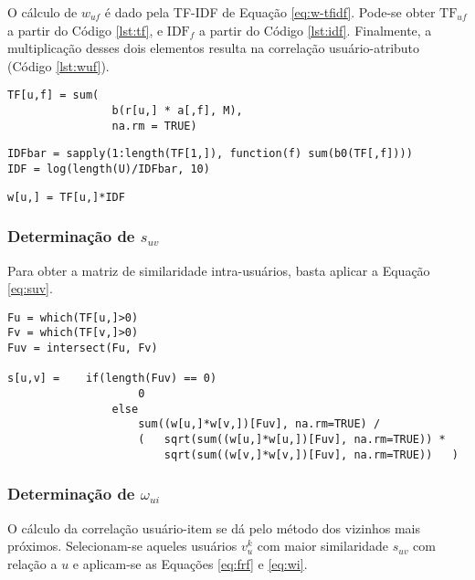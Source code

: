 O cálculo de $w_{uf}$ é dado pela TF-IDF de Equação \ref{eq:w-tfidf}. Pode-se obter $\mathrm{TF}_{uf}$ a partir do Código \ref{lst:tf}, e $\mathrm{IDF}_{f}$ a partir do Código \ref{lst:idf}. Finalmente, a multiplicação desses dois elementos resulta na correlação usuário-atributo (Código \ref{lst:wuf}).


\begin{lstlisting}[caption=Determinação de $\mathrm{TF}_{uf}$,label=lst:tf]
TF[u,f] = sum(
        		b(r[u,] * a[,f], M),
        		na.rm = TRUE)
\end{lstlisting}


\begin{lstlisting}[caption=Determinação de $\mathrm{IDF}_{f}$,label=lst:idf]
IDFbar = sapply(1:length(TF[1,]), function(f) sum(b0(TF[,f])))
IDF = log(length(U)/IDFbar, 10)
\end{lstlisting}

\begin{lstlisting}[caption=Determinação de $w_{uf}$,label=lst:wuf]
w[u,] = TF[u,]*IDF
\end{lstlisting}

\subsubsection{Determinação de $s_{uv}$} %
\label{ssub:determina_o_de_}

Para obter a matriz de similaridade intra-usuários, basta aplicar a Equação \ref{eq:suv}.

\begin{lstlisting}[caption=Determinação de $s_{uv}$]
Fu = which(TF[u,]>0)
Fv = which(TF[v,]>0)
Fuv = intersect(Fu, Fv)

s[u,v] = 	if(length(Fuv) == 0) 
					0 
				else 
					sum((w[u,]*w[v,])[Fuv], na.rm=TRUE) / 
					(	sqrt(sum((w[u,]*w[u,])[Fuv], na.rm=TRUE)) * 
						sqrt(sum((w[v,]*w[v,])[Fuv], na.rm=TRUE))	)

\end{lstlisting}

\subsubsection{Determinação de $\omega_{ui}$} %
\label{ssub:determina_o_de_}

O cálculo da correlação usuário-item se dá pelo método dos vizinhos mais próximos. Selecionam-se aqueles usuários $v_u^k$ com maior similaridade $s_{uv}$ com relação a $u$ e aplicam-se as Equações \ref{eq:frf} e \ref{eq:wi}.

